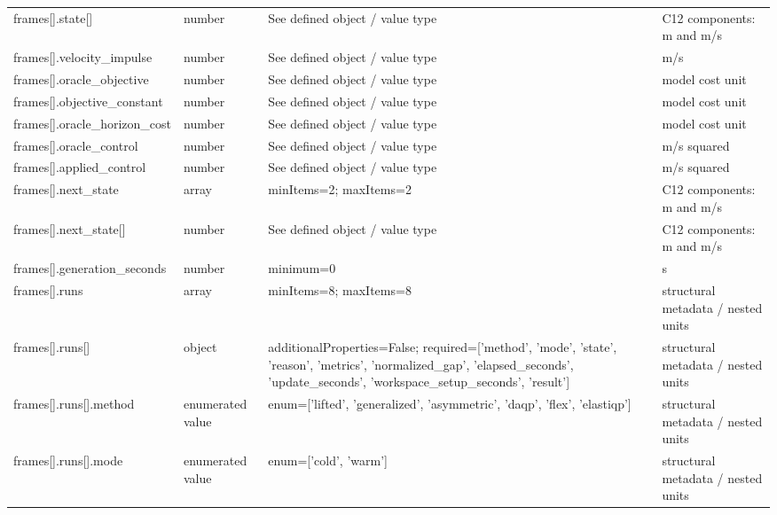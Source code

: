 \begin{longtable}{@{}>{\raggedright\arraybackslash}p{}>{\raggedright\arraybackslash}p{}>{\raggedright\arraybackslash}p{}>{\raggedright\arraybackslash}p{}@{}}
frames[].\allowbreak{}state[] & number & See defined object /\allowbreak{} value type & C12 components: m and m/\allowbreak{}s\\
frames[].\allowbreak{}velocity\_\allowbreak{}impulse & number & See defined object /\allowbreak{} value type & m/\allowbreak{}s\\
frames[].\allowbreak{}oracle\_\allowbreak{}objective & number & See defined object /\allowbreak{} value type & model cost unit\\
frames[].\allowbreak{}objective\_\allowbreak{}constant & number & See defined object /\allowbreak{} value type & model cost unit\\
frames[].\allowbreak{}oracle\_\allowbreak{}horizon\_\allowbreak{}cost & number & See defined object /\allowbreak{} value type & model cost unit\\
frames[].\allowbreak{}oracle\_\allowbreak{}control & number & See defined object /\allowbreak{} value type & m/\allowbreak{}s squared\\
frames[].\allowbreak{}applied\_\allowbreak{}control & number & See defined object /\allowbreak{} value type & m/\allowbreak{}s squared\\
frames[].\allowbreak{}next\_\allowbreak{}state & array & minItems=\allowbreak{}2; maxItems=\allowbreak{}2 & C12 components: m and m/\allowbreak{}s\\
frames[].\allowbreak{}next\_\allowbreak{}state[] & number & See defined object /\allowbreak{} value type & C12 components: m and m/\allowbreak{}s\\
frames[].\allowbreak{}generation\_\allowbreak{}seconds & number & minimum=\allowbreak{}0 & s\\
frames[].\allowbreak{}runs & array & minItems=\allowbreak{}8; maxItems=\allowbreak{}8 & structural metadata /\allowbreak{} nested units\\
frames[].\allowbreak{}runs[] & object & additionalProperties=\allowbreak{}False; required=\allowbreak{}['method', 'mode', 'state', 'reason', 'metrics', 'normalized\_\allowbreak{}gap', 'elapsed\_\allowbreak{}seconds', 'update\_\allowbreak{}seconds', 'workspace\_\allowbreak{}setup\_\allowbreak{}seconds', 'result'] & structural metadata /\allowbreak{} nested units\\
frames[].\allowbreak{}runs[].\allowbreak{}method & enumerated value & enum=\allowbreak{}['lifted', 'generalized', 'asymmetric', 'daqp', 'flex', 'elastiqp'] & structural metadata /\allowbreak{} nested units\\
frames[].\allowbreak{}runs[].\allowbreak{}mode & enumerated value & enum=\allowbreak{}['cold', 'warm'] & structural metadata /\allowbreak{} nested units\\

\end{longtable}
